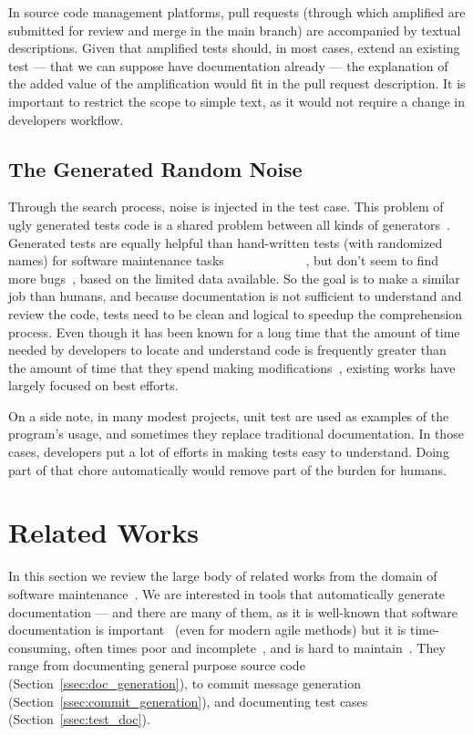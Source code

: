 \documentclass[a4paper,11pt]{sdm_internship}
\newcommand{\todo}[1]{\colorbox{Red!75}{\textcolor{white}{\textbf{TODO\ifx&#1&\else: #1\fi}}}}
\theoremstyle{definition}
\begin{document}
In source code management platforms, pull requests (through which amplified are submitted for review and merge in the main branch) are accompanied by textual descriptions.
Given that amplified tests should, in most cases, extend an existing test --- that we can suppose have documentation already --- the explanation of the added value of the amplification would fit in the pull request description.
It is important to restrict the scope to simple text, as it would not require a change in developers workflow.

\subsection{The Generated Random Noise}%
\label{ssec:random_noise}
Through the search process, noise is injected in the test case.
This problem of ugly generated tests code is a shared problem between all kinds of generators~\cite{rojas2017search}.
Generated tests are equally helpful than hand-written tests (with randomized names) for software maintenance tasks~\cite{shamshiri2018how}\todo{\cite{grano2018empirical}}, but don't seem to find more bugs~\cite{fraser2015does}, based on the limited data available.
So the goal is to make a similar job than humans, and because documentation is not sufficient to understand and review the code, tests need to be clean and logical to speedup the comprehension process.
Even though it has been known for a long time that the amount of time needed by developers to locate and understand code is frequently greater than the amount of time that they spend making modifications~\cite{ko2006exploratory}, existing works have largely focused on best efforts.

On a side note, in many modest projects, unit test are used as examples of the program's usage, and sometimes they replace traditional documentation.
In those cases, developers put a lot of efforts in making tests easy to understand.
Doing part of that chore automatically would remove part of the burden for humans.


\section{Related Works}%
\label{sec:related_works}
In this section we review the large body of related works from the domain of software maintenance~\cite{swanson1976dimensions}.
We are interested in tools that automatically generate documentation --- and there are many of them, as it is well-known that software documentation is important~\cite{de2005study} (even for modern agile methods) but it is time-consuming, often times poor and incomplete~\cite{briand2003software}, and is hard to maintain~\cite{forward2002relevance}.
They range from documenting general purpose source code (Section~\ref{ssec:doc_generation}), to commit message generation (Section~\ref{ssec:commit_generation}), and documenting test cases (Section~\ref{ssec:test_doc}).
\end{document}
